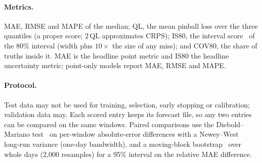 \paragraph{Metrics.} MAE, RMSE and MAPE of the median; QL, the mean pinball loss over the three quantiles (a proper
score; $2\,\mathrm{QL}$ approximates CRPS); IS80, the interval score~\citep{gneiting2007scoring} of the 80\% interval
(width plus $10\times$ the size of any miss); and COV80, the share of truths inside it. MAE is the headline point
metric and IS80 the headline uncertainty metric; point-only models report MAE, RMSE and MAPE.

\paragraph{Protocol.} Test data may not be used for training, selection, early stopping or calibration;
validation data may. Each scored entry keeps its forecast file, so any two entries can be compared on the same
windows. Paired comparisons use the Diebold--Mariano test~\citep{diebold1995dm} on per-window absolute-error
differences with a Newey--West~\citep{newey1987hac} long-run variance (one-day bandwidth), and a moving-block
bootstrap~\citep{kunsch1989bootstrap} over whole days (2,000 resamples) for a 95\% interval on the relative MAE
difference.
